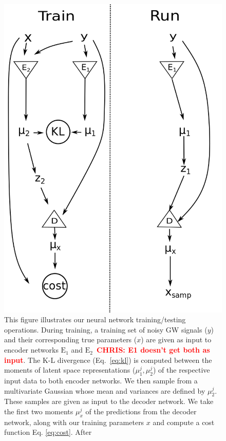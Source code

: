 \documentclass[%
showpacs,
 amsmath,amssymb,
 aps,
 twocolumn,
 prl,
 reprint,
floatfix,
]{revtex4-1}
\newcommand{\chris}[1]{\textbf{\textcolor{red}{CHRIS: #1}}}
\begin{document}
\begin{figure}
    \includegraphics[width=\columnwidth]{images/network_setup.png}
    \caption{\label{fig:network_config} This figure illustrates our neural
network training/testing operations. During training, a training set of noisy
\ac{GW} signals ($y$) and their corresponding true parameters ($x$) are given
as input to encoder networks $\textrm{E}_1$ and $\textrm{E}_2$~\chris{E1
doesn't get both as input}. The K-L divergence (Eq.~\ref{eq:kl}) is computed
between the moments of latent space representations ($\mu^{j}_{1},\mu^{j}_{2}$)
of the respective input data to both encoder networks. We then sample from a
multivariate Gaussian whose mean and variances are defined by $\mu^{j}_{2}$.
These samples are given as input to the decoder network. We take the first two
moments $\mu^{j}_x$ of the predictions from the decoder network, along with our
training parameters $x$ and compute a cost function Eq. \ref{eq:cost}. After
}
\end{figure}
\end{document}
